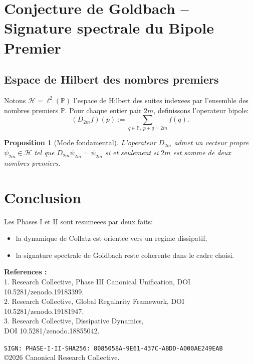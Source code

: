 \documentclass[12pt]{article}
\newtheorem{proposition}{Proposition}
\begin{document}
\section{Conjecture de Goldbach -- Signature spectrale du Bipole Premier}
\subsection{Espace de Hilbert des nombres premiers}
Notons $\mathcal H=\ell^2(\mathbb P)$ l'espace de Hilbert des suites indexees
par l'ensemble des nombres premiers $\mathbb P$.
Pour chaque entier pair $2m$, definissons l'operateur bipole:
\[
(D_{2m}f)(p):=\sum_{q\in\mathbb P,\;p+q=2m} f(q).
\]

\begin{proposition}[Mode fondamental]
L'operateur $D_{2m}$ admet un vecteur propre $\psi_{2m}\in\mathcal H$ tel que
$D_{2m}\psi_{2m}=\psi_{2m}$ si et seulement si $2m$ est somme de deux nombres premiers.
\end{proposition}

\section*{Conclusion}
Les Phases I et II sont resumeees par deux faits:
\begin{itemize}
  \item la dynamique de Collatz est orientee vers un regime dissipatif,
  \item la signature spectrale de Goldbach reste coherente dans le cadre choisi.
\end{itemize}

\bigskip
\noindent\textbf{References :}\\
1. Research Collective, Phase III Canonical Unification, DOI 10.5281/zenodo.19183399.\\
2. Research Collective, Global Regularity Framework, DOI 10.5281/zenodo.19181947.\\
3. Research Collective, Dissipative Dynamics,\\
   DOI 10.5281/zenodo.18855042.

\medskip
\noindent \texttt{SIGN: PHASE-I-II-SHA256: 8085058A-9E61-437C-ABDD-A000AE249EAB}\\
\copyright 2026 Canonical Research Collective.
\end{document}
